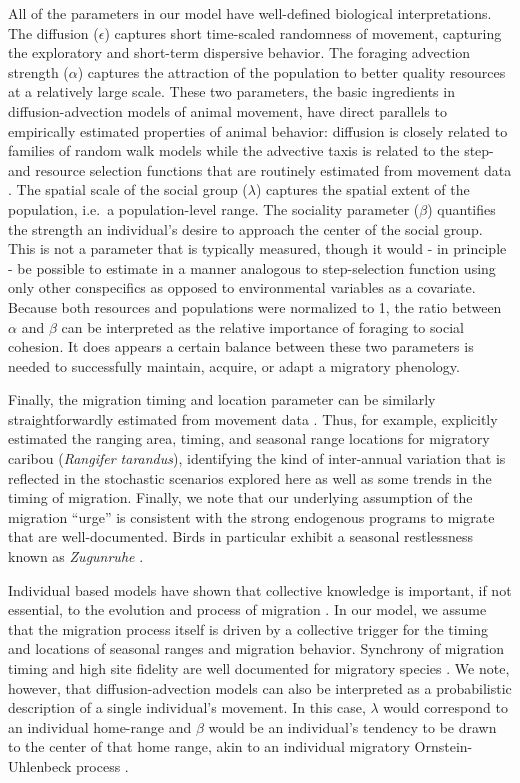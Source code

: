 \documentclass[utf8]{frontiersSCNS} %
\begin{document}
All of the parameters in our model have well-defined biological interpretations. The diffusion ($\epsilon$) captures short time-scaled randomness of movement, capturing the exploratory and short-term dispersive behavior. The foraging advection strength ($\alpha$) captures the attraction of the population to better quality resources at a relatively large scale. These two parameters, the basic ingredients in diffusion-advection models of animal movement, have direct parallels to empirically estimated properties of animal behavior: diffusion is closely related to families of random walk models \citep{Gurarie2011} while the advective taxis is related to the step- and resource selection functions that are routinely estimated from movement data \citep{Potts2020}. The spatial scale of the social group ($\lambda$) captures the spatial extent of the population, i.e.~a population-level range. The sociality parameter ($\beta$) quantifies the strength an individual's desire to approach the center of the social group. This is not a parameter that is typically measured, though it would - in principle - be possible to estimate in a manner analogous to step-selection function using only other conspecifics as opposed to environmental variables as a covariate. Because both resources and populations were normalized to 1, the ratio between $\alpha$ and $\beta$ can be interpreted as the relative importance of foraging to social cohesion. It does appears a certain balance between these two parameters is needed to successfully maintain, acquire, or adapt a migratory phenology. 

Finally, the migration timing and location parameter can be similarly straightforwardly estimated from movement data \citep{Cagnacci2015, Gurarie2019}. Thus, for example, \citet{Gurarie2019} explicitly estimated the ranging area, timing, and seasonal range locations for migratory caribou (\emph{Rangifer tarandus}), identifying the kind of inter-annual variation that is reflected in the stochastic scenarios explored here as well as some trends in the timing of migration. Finally, we note that our underlying assumption of the migration ``urge'' is consistent with the strong endogenous programs to migrate that are well-documented. Birds in particular exhibit a seasonal restlessness known as \emph{Zugunruhe} \citep{Berthold1999, Helm2006}.

Individual based models have shown that collective knowledge is important, if not essential, to the evolution and process of migration \citep{Shaw2013, Guttal2010, Berdahl2018}. In our model, we assume that the migration process itself is driven by a collective trigger for the timing and locations of seasonal ranges and migration behavior. Synchrony of migration timing and high site fidelity are well documented for migratory species \citep{Gurarie2019, Joly2021}. We note, however, that diffusion-advection models can also be interpreted as a probabilistic description of a single individual's movement. In this case, $\lambda$ would correspond to an individual home-range and $\beta$ would be an individual's tendency to be drawn to the center of that home range, akin to an individual migratory Ornstein-Uhlenbeck process \citep{Gurarie2017}.
\end{document}
